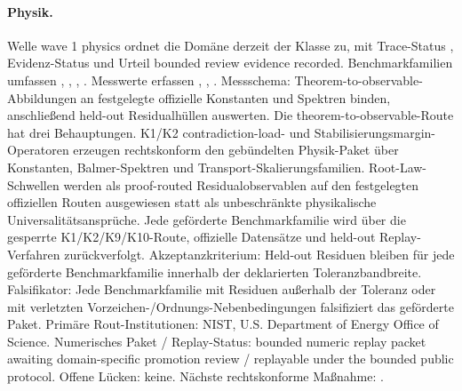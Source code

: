 \paragraph{Physik.}
Welle wave 1 physics ordnet die Domäne derzeit der Klasse  zu, mit Trace-Status , Evidenz-Status  und Urteil bounded review evidence recorded.
Benchmarkfamilien umfassen , \allowbreak {}, \allowbreak {}, \allowbreak {}.
Messwerte erfassen , \allowbreak {}, \allowbreak {}.
Messschema: Theorem-to-observable-Abbildungen an festgelegte offizielle Konstanten und Spektren binden, anschließend held-out Residualhüllen auswerten.
Die theorem-to-observable-Route hat drei Behauptungen. K1/K2 contradiction-load- und Stabilisierungsmargin-Operatoren erzeugen rechtskonform den gebündelten Physik-Paket über Konstanten, Balmer-Spektren und Transport-Skalierungsfamilien. Root-Law-Schwellen werden als proof-routed Residualobservablen auf den festgelegten offiziellen Routen ausgewiesen statt als unbeschränkte physikalische Universalitätsansprüche. Jede geförderte Benchmarkfamilie wird über die gesperrte K1/K2/K9/K10-Route, offizielle Datensätze und held-out Replay-Verfahren zurückverfolgt.
Akzeptanzkriterium: Held-out Residuen bleiben für jede geförderte Benchmarkfamilie innerhalb der deklarierten Toleranzbandbreite.
Falsifikator: Jede Benchmarkfamilie mit Residuen außerhalb der Toleranz oder mit verletzten Vorzeichen-/Ordnungs-Nebenbedingungen falsifiziert das geförderte Paket.
Primäre Rout-Institutionen: NIST, \allowbreak U.S. Department of Energy Office of Science.
Numerisches Paket / Replay-Status: bounded numeric replay packet awaiting domain-specific promotion review / replayable under the bounded public protocol.
Offene Lücken: keine.
Nächste rechtskonforme Maßnahme: .

